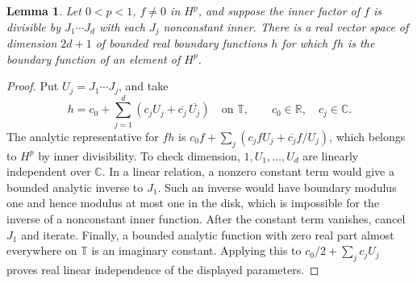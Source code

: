 \documentclass[11pt]{article}
\numberwithin{equation}{section}
\newtheorem{lemma}[theorem]{Lemma}
\theoremstyle{remark}
\newcommand{\T}{\mathbb T}
\newcommand{\R}{\mathbb R}
\newcommand{\C}{\mathbb C}
\begin{document}
\begin{lemma}\label{lem:prefix}
Let \(0<p<1\), \(f\ne0\) in \(H^p\), and suppose the inner factor of
\(f\) is divisible by \(J_1\cdots J_d\) with each \(J_j\) nonconstant
inner. There is a real vector space of dimension \(2d+1\) of bounded
real boundary functions \(h\) for which \(fh\) is the boundary
function of an element of \(H^p\).
\end{lemma}
\begin{proof}
Put \(U_j=J_1\cdots J_j\), and take
\[
 h=c_0+\sum_{j=1}^d(c_j U_j+\overline{c_j}\,\overline{U_j})
 \quad\text{on }\T,\qquad c_0\in\R,\quad c_j\in\C .
\]
The analytic representative for \(fh\) is
\(c_0 f+\sum_j(c_j fU_j+\overline{c_j}f/U_j)\), which belongs to \(H^p\)
by inner divisibility. To check dimension, \(1,U_1,\ldots,U_d\)
are linearly independent over \(\C\). In a linear relation, a nonzero
constant term would give a bounded analytic inverse to \(J_1\).
Such an inverse would have boundary modulus one and hence modulus
at most one in the disk, which is impossible for the inverse of a
nonconstant inner function. After the constant term vanishes, cancel
\(J_1\) and iterate. Finally, a bounded analytic function with
zero real part almost everywhere on \(\T\) is an imaginary constant.
Applying this to \(c_0/2+\sum_j c_j U_j\) proves real linear independence
of the displayed parameters.
\end{proof}
\end{document}
